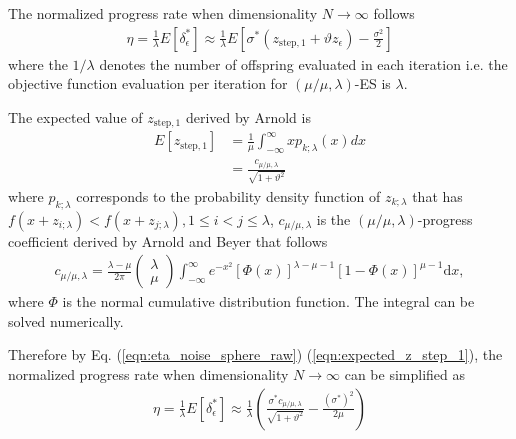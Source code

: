 The normalized progress rate when dimensionality $N \rightarrow \infty$ follows 
\begin{align}\label{eqn:eta_noise_sphere_raw}{}
\eta = \frac{1}{\lambda}E[ \delta_\epsilon^*] \approx \frac{1}{\lambda} E \left[ \sigma^* (z_{\text{step},1} + \vartheta z_\epsilon ) - \frac{\sigma^2}{2}  \right]
\end{align}
where the $1/\lambda$ denotes the number of offspring evaluated in each iteration i.e. the objective function evaluation per iteration for $(\mu/\mu,\lambda)$-ES is $\lambda$.

The expected value of $z_{\text{step},1}$ derived by Arnold \cite{ARNOLD2001127} is
\begin{align}\label{eqn:expected_z_step_1}{}
E[z_{\text{step},1}] &= \frac{1}{\mu} \int_{-\infty}^\infty x p_{k;\lambda}(x)dx \\
& = \frac{c_{\mu/\mu,\lambda}}{\sqrt{1+ \vartheta^2}}
\end{align}
where $p_{k;\lambda}$ corresponds to the probability density function of $z_{k;\lambda}$ that has $f(x+z_{i;\lambda})<f(x+z_{j;\lambda}), 1 \leq i<j \leq \lambda$, $c_{\mu/\mu,\lambda}$ is the $(\mu/\mu,\lambda)$-progress coefficient derived by Arnold and Beyer \cite{Arnold:2000:EMS:645825.669117} that follows
\begin{align}\label{eqn:c_mu_mu_lambda}
c_{\mu/\mu,\lambda}  = \frac{\lambda-\mu}{2 \pi} \begin{pmatrix} \lambda \\ \mu \end{pmatrix} \int_{-\infty}^{\infty} e^{-x^2}   \left [ \Phi(x)\right]^{\lambda-\mu-1}  \left[ 1- \Phi (x) \right]^{\mu-1}  \text{d} x,
\end{align}
where $\Phi$ is the normal cumulative distribution function. The integral can be solved numerically.  

Therefore by Eq. (\ref{eqn:eta_noise_sphere_raw}) (\ref{eqn:expected_z_step_1}), the normalized progress rate when dimensionality $N \rightarrow \infty$ can be simplified as
\begin{align}{}\label{eqn:eta_noise_sphere}{}
\eta = \frac{1}{\lambda}E[ \delta_\epsilon^*] \approx \frac{1}{\lambda} \left( \frac{\sigma^* c_{\mu / \mu, \lambda}}{\sqrt {1+ \vartheta^2}} - \frac{(\sigma^*)^2}{2 \mu} \right)
\end{align}



